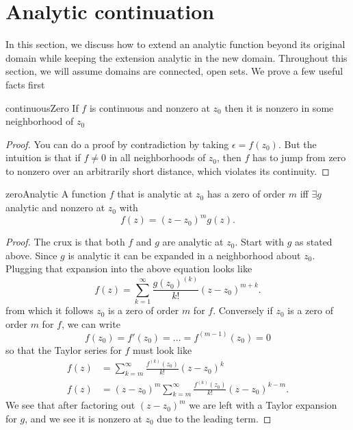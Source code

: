 \section{Analytic continuation}\label{sec:analytic_continuation}

In this section, we discuss how to extend an analytic function beyond its
original domain while keeping the extension analytic in the new domain.
Throughout this section, we will assume domains are connected, open sets.
We prove a few useful facts first

\begin{proposition}{}{continuousZero}
If $f$ is continuous and nonzero at $z_0$ then it is nonzero in some
neighborhood of $z_0$
\begin{proof}
You can do a proof by contradiction by taking $\epsilon=f(z_0)$. But the
intuition is that if $f\neq0$ in all neighborhoods of $z_0$, then $f$ has to
jump from zero to nonzero over an arbitrarily short distance, 
which violates its continuity.
\end{proof}
\end{proposition}

\begin{proposition}{}{zeroAnalytic}
A function $f$ that is analytic at $z_0$ has a zero of order $m$ iff $\exists g$
analytic and nonzero at $z_0$ with
$$
f(z)=(z-z_0)^m g(z).
$$
\begin{proof}
The crux is that both $f$ and $g$ are analytic at $z_0$. Start with $g$ as
stated above. Since $g$ is analytic it can be expanded in a neighborhood about
$z_0$. Plugging that expansion into the above equation looks like
$$
f(z)=\sum_{k=1}^\infty \frac{g(z_0)^{(k)}}{k!}(z-z_0)^{m+k}.
$$
from which it follows $z_0$ is a zero of order $m$ for $f$.
Conversely if $z_0$ is a zero of order $m$ for $f$, we can write
$$
f(z_0)=f'(z_0)=...=f^{(m-1)}(z_0)=0
$$
so that the Taylor series for $f$ must look like
\begin{equation*}\begin{aligned}
f(z)&=\sum_{k=m}^\infty \frac{f^{(k)}(z_0)}{k!}(z-z_0)^k\\
f(z)&=(z-z_0)^m\sum_{k=m}^\infty \frac{f^{(k)}(z_0)}{k!}(z-z_0)^{k-m}.
\end{aligned}\end{equation*}
We see that after factoring out $(z-z_0)^m$ we are left with a Taylor expansion
for $g$, and we see it is nonzero at $z_0$ due to the leading term.
\end{proof}
\end{proposition}

